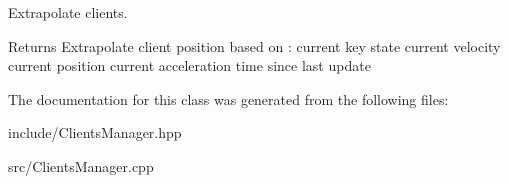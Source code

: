 Extrapolate clients. 

\begin{DoxyReturn}{Returns}
Extrapolate client position based on \-: current key state current velocity current position current acceleration time since last update 
\end{DoxyReturn}


The documentation for this class was generated from the following files\-:\begin{DoxyCompactItemize}
\item 
include/Clients\-Manager.\-hpp\item 
src/Clients\-Manager.\-cpp\end{DoxyCompactItemize}
